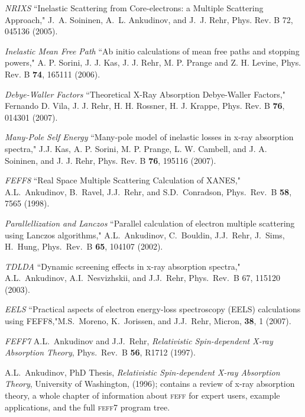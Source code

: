 \documentclass[11pt,oneside]{report} %
\newcommand{\program}[1]{\textsc{#1}}
\newcommand{\feff}{\program{feff}}
\begin{document}
\begin{latexonly}
\begin{Reflist}
\item [\textit{NRIXS}] ``Inelastic Scattering from Core-electrons: a Multiple Scattering
Approach," J.~A. Soininen, A.~L. Ankudinov, and J.~J. Rehr,
Phys. Rev. B 72, 045136 (2005).

\item [\textit{Inelastic Mean Free Path}]  ``Ab initio calculations of mean free paths and stopping powers,"
A. P. Sorini, J. J. Kas, J. J. Rehr, M. P. Prange and Z. H. Levine,
Phys. Rev. B {\bf 74}, 165111 (2006).

\item [\textit{Debye-Waller Factors}] ``Theoretical X-Ray Absorption Debye-Waller Factors,"
Fernando D. Vila, J. J. Rehr, H. H. Rossner, H. J. Krappe,
Phys. Rev. B {\bf76}, 014301 (2007).

\item [\textit{Many-Pole Self Energy}]  ``Many-pole model of inelastic losses in x-ray absorption spectra,"
J.J. Kas, A. P. Sorini, M. P. Prange, L. W. Cambell, and J. A. Soininen,
and J. J. Rehr, Phys. Rev. B {\bf 76}, 195116 (2007).

\item [\textit{FEFF8}]  ``Real Space Multiple Scattering
    Calculation of XANES," A.L.\ Ankudinov, B.\ Ravel,
  J.J.\ Rehr, and S.D.\ Conradson, Phys.\ Rev.\ B \textbf{58}, 7565 (1998).

\item [\textit{Parallellization and Lanczos}] ``Parallel calculation of electron multiple scattering 
   using Lanczos algorithms," A.L.\ Ankudinov, C.\ Bouldin, J.J.\ Rehr, J.\ Sims, H.\ Hung,
    Phys.\ Rev.\ B \textbf{65}, 104107 (2002).
 
\item [\textit{TDLDA}] ``Dynamic screening effects in x-ray absorption spectra," A.L.\ Ankudinov, A.I.\ Nesvizhskii, and J.J.\ Rehr,
Phys.\ Rev.\ B 67, 115120 (2003). 

\item [\textit{EELS}] ``Practical aspects of
electron energy-loss spectroscopy (EELS) calculations using FEFF8,"M.S.\ Moreno, K.\ Jorissen, and J.J.\ Rehr, 
Micron, {\bf38}, 1 (2007).
 
\item [\textit{FEFF7}] A.L.\ Ankudinov and J.J.\ Rehr, \emph{Relativistic
    Spin-dependent X-ray Absorption Theory}, Phys.\ Rev.\ B \textbf{56},
  R1712 (1997).
 
  A.L.\ Ankudinov, PhD Thesis, \emph{Relativistic Spin-dependent
    X-ray Absorption Theory}, University of Washington, (1996); 
  contains a review of x-ray absorption theory, a whole chapter
  of information about {\feff} for expert users, example
  applications, and the full {\feff}7 program tree.
 

\end{Reflist}
\end{latexonly}
\end{document}
